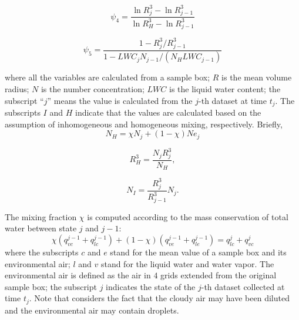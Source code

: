 \begin{equation}
\psi_4 = \frac{\ln R_j^3 - \ln R_{j-1}^3}{\ln R_{H}^3 - \ln R_{j-1}^3}
\label{phi3}
\end{equation}

\begin{equation}
\psi_5 = \frac{1 - R_{j}^3/R_{j-1}^3}{1 - LWC_{j}N_{j-1}/(N_H LWC_{j-1})}
\label{phi4}
\end{equation}

where all the variables are calculated from a sample box; $R$ is the mean volume radius; $N$ is the number concentration; $LWC$ is the liquid water content; the subscript ``$j$'' means the value is calculated from the $j$-th dataset at time $t_j$. The subscripts $I$ and $H$ indicate that the values are calculated based on the assumption of inhomogeneous and homogeneous mixing, respectively. Briefly,
\[
N_H = \chi N_j + (1 - \chi) Ne_j
\]

\[
R_H^3 = \frac{N_jR_j^3}{N_H},
\]

\[
N_I = \frac{R_j^3}{R_{j-1}^3}N_j.
\]



The mixing fraction $\chi$ is computed according to the mass conservation of total water between state $j$ and $j-1$:
\begin{equation}
\chi(q^{j-1}_{vc} + q^{j-1}_{lc}) + (1-\chi)(q^{j-1}_{ve} + q^{j-1}_{le}) = q^{j}_{lc} + q^{j}_{vc}
\label{eq:mixing_frac}
\end{equation}
where the subscripts $c$ and $e$ stand for the mean 
value of a sample box and its environmental air; $l$ and $v$ stand for the liquid 
water and water vapor. The environmental air is defined as the air in $4$ 
grids extended from the original sample box; the subscript $j$ indicates the state of the $j$-th dataset 
collected at time $t_j$. Note that  considers the fact that the cloudy air may have 
been diluted and the environmental air may contain droplets.

